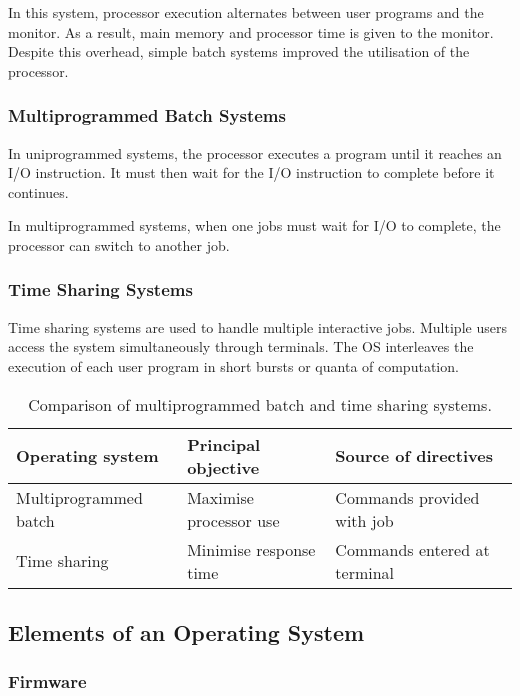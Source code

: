 In this system, processor execution alternates between user programs and the monitor.
As a result, main memory and processor time is given to the monitor.
Despite this overhead, simple batch systems improved the utilisation of the processor.

\subsubsection{Multiprogrammed Batch Systems}

In uniprogrammed systems, the processor executes a program until it reaches an I/O instruction.
It must then wait for the I/O instruction to complete before it continues.

In multiprogrammed systems, when one jobs must wait for I/O to complete, the processor can switch to another job.

\subsubsection{Time Sharing Systems}

Time sharing systems are used to handle multiple interactive jobs.
Multiple users access the system simultaneously through terminals.
The OS interleaves the execution of each user program in short bursts or quanta of computation.

\begin{table}[htp]
  \centering
  \caption*{Comparison of multiprogrammed batch and time sharing systems.}
  \begin{tabular}{lll}
    \toprule
    Operating system & Principal objective & Source of directives \\
    \midrule
    Multiprogrammed batch & Maximise processor use & Commands provided with job \\
    Time sharing & Minimise response time & Commands entered at terminal \\
    \bottomrule
  \end{tabular}
\end{table}

\subsection{Elements of an Operating System}

\subsubsection{Firmware}

